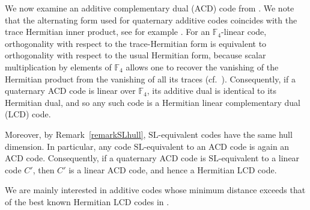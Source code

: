 \documentclass[a4paper,12pt]{article}
\theoremstyle{plain}
\theoremstyle{definition}
\begin{document}
 
 

We now examine an additive complementary dual (ACD) code from \cite[Table IV]{guan2023}. 
We note that the alternating form used for quaternary additive codes coincides with the trace Hermitian inner product, see for example \cite{ezermanconcise}. 
For an $\mathbb{F}_4$-linear code, orthogonality with respect to the trace-Hermitian form is equivalent to orthogonality with respect to the usual Hermitian form, because scalar multiplication by elements of $\mathbb{F}_4$ allows one to recover the vanishing of the Hermitian product from the vanishing of all its traces (cf.\ \cite[Theorem 3]{calderbank1998}).
Consequently, if a quaternary ACD code is linear over $\mathbb{F}_4$, its additive dual is identical to its Hermitian dual, and so any such code is a Hermitian linear complementary dual (LCD) code.



Moreover, by Remark~\ref{remarkSLhull}, $\mathrm{SL}$-equivalent codes have the same
hull dimension. In particular, any code $\mathrm{SL}$-equivalent to an ACD code is
again an ACD code. Consequently, if a quaternary ACD code is $\mathrm{SL}$-equivalent
to a linear code $C'$, then $C'$ is a linear ACD code, and hence a Hermitian LCD code.


We are mainly interested in   additive codes whose minimum distance exceeds that of the best known Hermitian LCD codes in \cite[Table 6]{araya2024}. 
 
\end{document}
